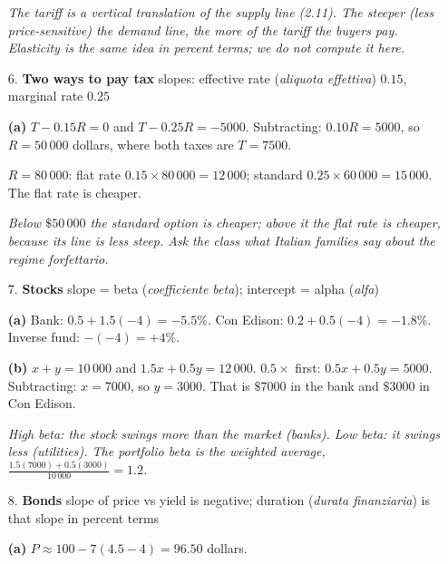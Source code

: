 \documentclass[12pt, twoside]{article}
\newcommand{\ita}[1]{(\emph{#1})}
\begin{document}
\begin{enumerate}[itemsep=0.3cm]
\emph{The tariff is a vertical translation of the supply line (2.11). The
steeper (less price-sensitive) the demand line, the more of the tariff the
buyers pay. Elasticity is the same idea in percent terms; we do not compute
it here.}

\newpage

\item[6.] \textbf{Two ways to pay tax} \quad slopes: effective rate
\ita{aliquota effettiva} $0.15$, marginal rate $0.25$

\textbf{(a)} $T - 0.15R = 0$ and $T - 0.25R = -5000$. Subtracting:
$0.10R = 5000$, so $R = 50\,000$ dollars, where both taxes are
$T = 7500$.

$R = 80\,000$: flat rate $0.15 \times 80\,000 = 12\,000$; standard
$0.25 \times 60\,000 = 15\,000$. The flat rate is cheaper.

\emph{Below $\$50\,000$ the standard option is cheaper; above it the flat
rate is cheaper, because its line is less steep. Ask the class what
Italian families say about the regime forfettario.}

\item[7.] \textbf{Stocks} \quad slope = beta \ita{coefficiente beta};
intercept = alpha \ita{alfa}

\textbf{(a)} Bank: $0.5 + 1.5(-4) = -5.5\%$. Con Edison:
$0.2 + 0.5(-4) = -1.8\%$. Inverse fund: $-(-4) = +4\%$.

\textbf{(b)} $x + y = 10\,000$ and $1.5x + 0.5y = 12\,000$.
$0.5 \times$ first: $0.5x + 0.5y = 5000$. Subtracting: $x = 7000$, so
$y = 3000$. That is $\$7000$ in the bank and $\$3000$ in Con Edison.

\emph{High beta: the stock swings more than the market (banks). Low beta:
it swings less (utilities). The portfolio beta is the weighted average,
$\frac{1.5(7000) + 0.5(3000)}{10\,000} = 1.2$.}

\item[8.] \textbf{Bonds} \quad slope of price vs yield is negative;
duration \ita{durata finanziaria} is that slope in percent terms

\textbf{(a)} $P \approx 100 - 7(4.5 - 4) = 96.50$ dollars.


\end{enumerate}
\end{document}
